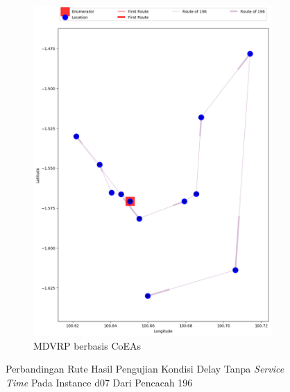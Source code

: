 \begin{figure}[H]
	\centering
	\begin{subfigure}[t]{\textwidth}
		\centering
		\includegraphics[width=\textwidth]{Resources/Images/delayed_7/real_m15_n100_delayed_7_196_coes}
		\caption{MDVRP berbasis CoEAs}
		\label{fig:real_m15_n100_delayed_7_196_coes}
	\end{subfigure}
	\caption{Perbandingan Rute Hasil Pengujian Kondisi Delay Tanpa \textit{Service Time} Pada Instance d07 Dari Pencacah 196}
	\label{fig:real_m15_n100_delayed_7_196}
\end{figure}


